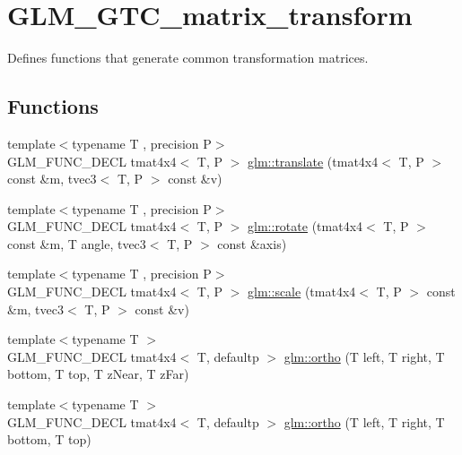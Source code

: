 \hypertarget{group__gtc__matrix__transform}{}\section{G\+L\+M\+\_\+\+G\+T\+C\+\_\+matrix\+\_\+transform}
\label{group__gtc__matrix__transform}


Defines functions that generate common transformation matrices.  


\subsection*{Functions}
\begin{DoxyCompactItemize}
\item 
{\footnotesize template$<$typename T , precision P$>$ }\\G\+L\+M\+\_\+\+F\+U\+N\+C\+\_\+\+D\+E\+C\+L tmat4x4$<$ T, P $>$ \hyperlink{group__gtc__matrix__transform_gaee134ab77c6c5548a6ebf4e8e476c6ed}{glm\+::translate} (tmat4x4$<$ T, P $>$ const \&m, tvec3$<$ T, P $>$ const \&v)
\item 
{\footnotesize template$<$typename T , precision P$>$ }\\G\+L\+M\+\_\+\+F\+U\+N\+C\+\_\+\+D\+E\+C\+L tmat4x4$<$ T, P $>$ \hyperlink{group__gtc__matrix__transform_ga161b1df124348f232d994ba7958e4815}{glm\+::rotate} (tmat4x4$<$ T, P $>$ const \&m, T angle, tvec3$<$ T, P $>$ const \&axis)
\item 
{\footnotesize template$<$typename T , precision P$>$ }\\G\+L\+M\+\_\+\+F\+U\+N\+C\+\_\+\+D\+E\+C\+L tmat4x4$<$ T, P $>$ \hyperlink{group__gtc__matrix__transform_ga8f062fcc07e2445500793f2803afebb0}{glm\+::scale} (tmat4x4$<$ T, P $>$ const \&m, tvec3$<$ T, P $>$ const \&v)
\item 
{\footnotesize template$<$typename T $>$ }\\G\+L\+M\+\_\+\+F\+U\+N\+C\+\_\+\+D\+E\+C\+L tmat4x4$<$ T, defaultp $>$ \hyperlink{group__gtc__matrix__transform_ga65280251de6e38580110a0577a43d8f8}{glm\+::ortho} (T left, T right, T bottom, T top, T z\+Near, T z\+Far)
\item 
{\footnotesize template$<$typename T $>$ }\\G\+L\+M\+\_\+\+F\+U\+N\+C\+\_\+\+D\+E\+C\+L tmat4x4$<$ T, defaultp $>$ \hyperlink{group__gtc__matrix__transform_ga45b1b64f99255c07119b4f1aaed04dd7}{glm\+::ortho} (T left, T right, T bottom, T top)
\item 

\end{DoxyCompactItemize}
